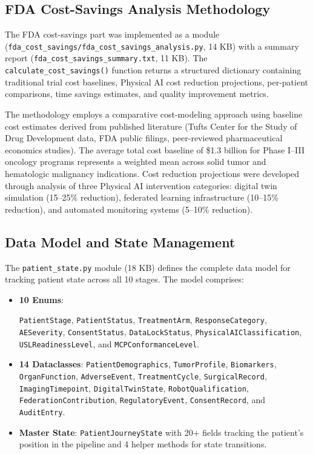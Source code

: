 \documentclass{article}
\begin{document}
\subsection{FDA Cost-Savings Analysis Methodology}

The FDA cost-savings part was implemented as a module (\texttt{fda\_cost\_savings/fda\_cost\_savings\_analysis.py}, 14 KB) with a summary report (\texttt{fda\_cost\_savings\_summary.txt}, 11 KB). The \texttt{calculate\_cost\_savings()} function returns a structured dictionary containing traditional trial cost baselines, Physical AI cost reduction projections, per-patient comparisons, time savings estimates, and quality improvement metrics.

The methodology employs a comparative cost-modeling approach using baseline cost estimates derived from published literature (Tufts Center for the Study of Drug Development data, FDA public filings, peer-reviewed pharmaceutical economics studies). The average total cost baseline of \$1.3 billion for Phase I--III oncology programs represents a weighted mean across solid tumor and hematologic malignancy indications. Cost reduction projections were developed through analysis of three Physical AI intervention categories: digital twin simulation (15--25\% reduction), federated learning infrastructure (10--15\% reduction), and automated monitoring systems (5--10\% reduction).

\subsection{Data Model and State Management}

The \texttt{patient\_state.py} module (18 KB) defines the complete data model for tracking patient state across all 10 stages. The model comprises:

\begin{itemize}[leftmargin=*]
\item \textbf{10 Enums}: \raggedright \arraybackslash \texttt{PatientStage}, \texttt{PatientStatus}, \texttt{TreatmentArm}, \texttt{ResponseCategory}, \texttt{AESeverity}, \texttt{ConsentStatus}, \texttt{DataLockStatus}, \texttt{PhysicalAIClassification}, \texttt{USLReadinessLevel}, and \texttt{MCPConformanceLevel}.

\item \textbf{14 Dataclasses}: \texttt{PatientDemographics}, \texttt{TumorProfile}, \texttt{Biomarkers}, \texttt{OrganFunction}, \texttt{AdverseEvent}, \texttt{TreatmentCycle}, \texttt{SurgicalRecord}, \texttt{ImagingTimepoint}, \texttt{DigitalTwinState}, \texttt{RobotQualification}, \texttt{FederationContribution}, \texttt{RegulatoryEvent}, \texttt{ConsentRecord}, and \texttt{AuditEntry}.

\item \textbf{Master State}: \texttt{PatientJourneyState} with 20+ fields tracking the patient's position in the pipeline and 4 helper methods for state transitions.
\end{itemize}
\end{document}
